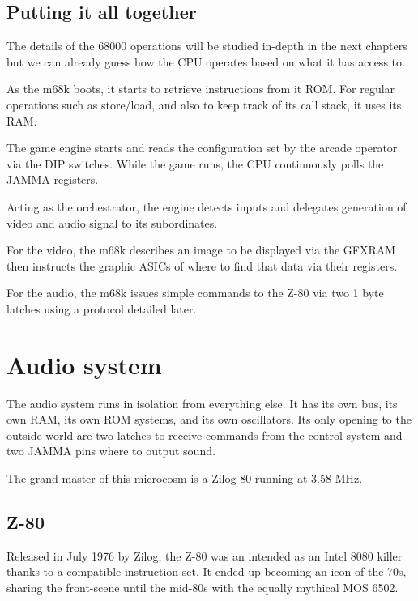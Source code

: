 \subsection{Putting it all together}

The details of the 68000 operations will be studied in-depth in the next chapters but we can already guess how the CPU operates based on what it has access to.

As the m68k boots, it starts to retrieve instructions from it ROM. For regular operations such as store/load, and also to keep track of its call stack, it uses its RAM. 

The game engine starts and reads the configuration set by the arcade operator via the DIP switches. While the game runs, the CPU continuously polls the JAMMA registers.

Acting as the orchestrator, the engine detects inputs and delegates generation of video and audio signal to its subordinates.

For the video, the m68k describes an image to be displayed via the GFXRAM then instructs the graphic ASICs of where to find that data via their registers. 

For the audio, the m68k issues simple commands to the Z-80 via two 1 byte latches using a protocol detailed later.
  











\pagebreak
\section{Audio system}
The audio system runs in isolation from everything else. It has its own bus, its own RAM, its own ROM systems, and its own oscillators. Its only opening to the outside world are two latches to receive commands from the control system and two JAMMA pins where to output sound.

The grand master of this microcosm is a Zilog-80 running at 3.58 MHz.

\subsection{Z-80}
Released in July 1976 by Zilog, the Z-80 was an intended as an Intel 8080 killer thanks to a compatible instruction set. It ended up becoming an icon of the 70s, sharing the front-scene until the mid-80s with the equally mythical MOS 6502. 

